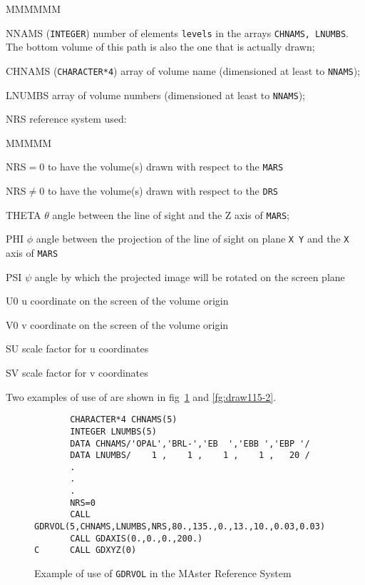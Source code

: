 \begin{DLtt}{MMMMMM}
\item[NNAMS]     ({\tt INTEGER}) number of elements {\tt levels} in the 
arrays {\tt CHNAMS, LNUMBS}. The bottom volume of this path is also the 
one that is actually drawn;
\item[CHNAMS]   ({\tt CHARACTER*4}) array of volume name (dimensioned 
at least to {\tt NNAMS});
\item[LNUMBS]   array of volume numbers (dimensioned at least to {\tt NNAMS});
\item[NRS]    reference system used:
\begin{DLtt}{MMMMM}
\item[NRS$=$0] to have the volume(s) drawn with respect to the {\tt MARS} 
\item[NRS$\neq$0] to have the volume(s) drawn with respect to the {\tt DRS}
\end{DLtt}
\item[THETA]   $\theta$ angle between the line of sight and the
                Z  axis of {\tt MARS};
\item[PHI]    $\phi$ angle between the projection of the line of sight
              on plane {\tt X Y} and the {\tt X} axis of {\tt MARS}
\item[PSI]   $\psi$ angle by which the projected image will
             be rotated on the screen plane
\item[U0]    u coordinate on the screen of the volume origin
\item[V0]    v  coordinate on the screen of the volume origin
\item[SU]   scale factor for u coordinates
\item[SV]   scale factor for v coordinates
\end{DLtt}
 
Two examples of use of  are shown in fig~\ref{fg:draw115-1} and
\ref{fg:draw115-2}.

\begin{figure}[hbt]
      \centering

\begin{verbatim}
       CHARACTER*4 CHNAMS(5)
       INTEGER LNUMBS(5)
       DATA CHNAMS/'OPAL','BRL-','EB  ','EBB ','EBP '/
       DATA LNUMBS/    1 ,    1 ,    1 ,    1 ,   20 /
       .
       .
       .
       NRS=0
       CALL GDRVOL(5,CHNAMS,LNUMBS,NRS,80.,135.,0.,13.,10.,0.03,0.03)
       CALL GDAXIS(0.,0.,0.,200.)
C      CALL GDXYZ(0)
\end{verbatim}

     \caption{Example of use of {\tt GDRVOL} in the MAster Reference System}
     \label{fg:draw115-1}


\end{figure}


